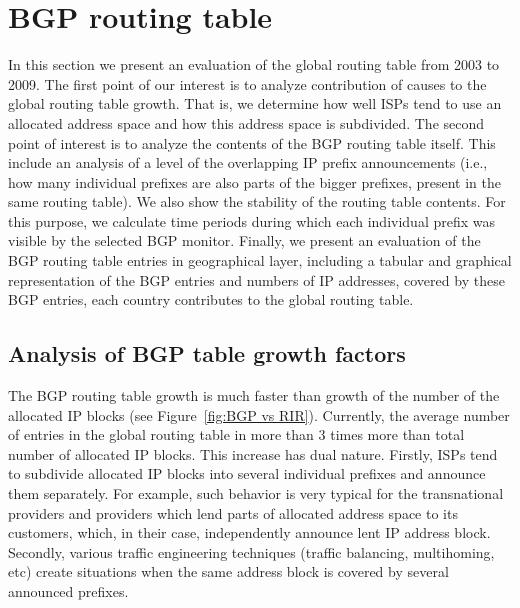 \section{BGP routing table}
\label{sec:bgp}

In this section we present an evaluation of the global routing table
from 2003 to 2009. The first point of our interest is to analyze contribution
of causes to the global routing table growth. That is, we determine how well
ISPs tend to use an allocated address space and how this address space is
subdivided. The second point of interest is to analyze the contents of the BGP
routing table itself. This include an analysis of a level of the overlapping
IP prefix announcements (i.e., how many individual prefixes are also parts of
the bigger prefixes, present in the same routing table). We also show the
stability of the routing table contents. For this purpose, we calculate time
periods during which each individual prefix was visible by the selected BGP
monitor. Finally, we present an evaluation of the BGP routing table entries in
geographical layer, including a tabular and graphical representation of the
BGP entries and numbers of IP addresses, covered by these BGP entries, each
country contributes to the global routing table.

\subsection{Analysis of BGP table growth factors}

The BGP routing table growth is much faster than growth of the number of the
allocated IP blocks (see Figure~\ref{fig:BGP vs RIR}). Currently, the average
number of entries in the global routing table in more than 3 times more than
total number of allocated IP blocks. This increase has dual nature. Firstly,
ISPs tend to subdivide allocated IP blocks into several individual prefixes
and announce them separately. For example, such behavior is very typical for
the transnational providers and providers which lend parts of allocated
address space to its customers, which, in their case, independently announce
lent IP address block. Secondly, various traffic engineering techniques
(traffic balancing, multihoming, etc) create situations when the same address
block is covered by several announced prefixes.


